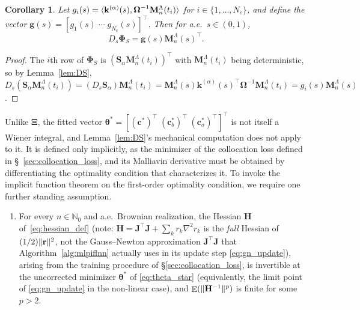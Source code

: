 \documentclass[11pt, a4paper]{article}
\theoremstyle{theoremstyle}
\newtheorem{corollary}[theorem]{Corollary}
\theoremstyle{definitionstyle}
\DeclareMathOperator{\EE}{\mathbb E}
\DeclarePairedDelimiter{\norm}{\lVert}{\rVert}
\DeclarePairedDelimiter{\ip}{\langle}{\rangle}
\begin{document}
\begin{corollary}\label{cor:DPhiS}
    Let $g_i(s)=\ip{\mathbf k^{(\alpha)}(s),\boldsymbol\Omega^{-1}\mathbf M_n^\Lambda(t_i)}$ for $i \in \{ 1,\dots,N_c \}$, and define the vector $\mathbf g(s)=[g_1(s)\; \cdots \;g_{N_c}(s)]^\top$. Then for a.e.\ $s\in(0,1)$,
    \begin{equation}\label{eq:DPhiS}
        D_s\boldsymbol\Phi_S=\mathbf g(s)\mathbf M_n^\Lambda(s)^\top.
    \end{equation}
\end{corollary}

\begin{proof}
    The $i$th row of $\boldsymbol \Phi_S$ is $(\mathbf S_\alpha \mathbf M_n^\Lambda(t_i))^\top$ with $\mathbf M_n^\Lambda(t_i)$ being deterministic, so by Lemma~\ref{lem:DS}, $D_s(\mathbf S_\alpha \mathbf M_n^\Lambda(t_i))=(D_s\mathbf S_\alpha)\mathbf M_n^\Lambda(t_i)=\mathbf M_n^\Lambda(s)\mathbf k^{(\alpha)}(s)^\top \boldsymbol \Omega^{-1} \mathbf M_n^\Lambda(t_i)=g_i(s)\mathbf M_n^\Lambda(s)$.
\end{proof}

Unlike $\boldsymbol \Xi$, the fitted vector $\boldsymbol \theta^* =[(\mathbf c^*)^\top \; (\mathbf c_b^*)^\top \; (\mathbf c_\sigma^*)^\top]^\top$ is not itself a Wiener integral, and Lemma~\ref{lem:DS}'s mechanical computation does not apply to it. It is defined only implicitly, as the minimizer of the collocation loss defined in \S~\ref{sec:collocation_loss}, and its Malliavin derivative must be obtained by differentiating the optimality condition that characterizes it. To invoke the implicit function theorem \cite{rudin1976principles} on the first-order optimality condition, we require one further standing assumption.

\begin{enumerate}[resume=assumptions,label=(A\arabic*)]
    \item \label{as:a5} For every $n \in \mathbb N_0$ and a.e.\ Brownian realization, the Hessian $\mathbf H$ of~\eqref{eq:hessian_def} (note: $\mathbf H=\mathbf J^\top\mathbf J+\sum_kr_k\nabla^2r_k$ is the \emph{full} Hessian of $(1/2)\norm{\mathbf r}^2$, not the Gauss--Newton approximation $\mathbf J^\top\mathbf J$ that Algorithm~\ref{alg:mlpiflnn} actually uses in its update step \eqref{eq:gn_update}), arising from the training procedure of \S\ref{sec:collocation_loss}, is invertible at the uncorrected minimizer $\boldsymbol \theta^*$ of \eqref{eq:theta_star} (equivalently, the limit point of \eqref{eq:gn_update} in the non-linear case), and $\EE(\norm{\mathbf H^{-1}}^p)$ is finite for some $p>2$.
\end{enumerate}
\end{document}
